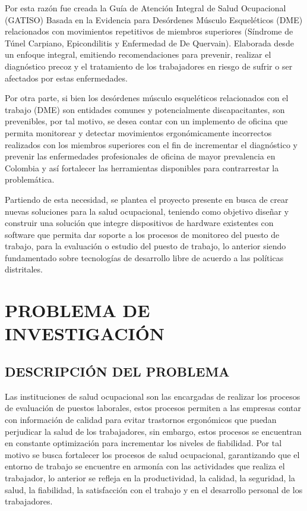 Por esta razón fue creada la Guía de Atención Integral de Salud Ocupacional (GATISO) Basada en la Evidencia para Desórdenes Músculo Esqueléticos (DME) relacionados con movimientos repetitivos de miembros superiores (Síndrome de Túnel Carpiano, Epicondilitis y Enfermedad de De Quervain). Elaborada desde un enfoque integral, emitiendo recomendaciones para prevenir, realizar el diagnóstico precoz y el tratamiento de los trabajadores en riesgo de sufrir o ser afectados por estas enfermedades.

Por otra parte, si bien los desórdenes músculo esqueléticos relacionados con el trabajo (DME) son entidades comunes y potencialmente discapacitantes, son prevenibles, por tal motivo, se desea contar con un implemento de oficina que permita monitorear y detectar movimientos ergonómicamente incorrectos realizados con los miembros superiores con el fin de incrementar el diagnóstico y prevenir las enfermedades profesionales de oficina de mayor prevalencia en Colombia y así fortalecer las herramientas disponibles para contrarrestar la problemática.

Partiendo de esta necesidad, se plantea el proyecto presente en busca de crear nuevas soluciones para la salud ocupacional, teniendo como objetivo diseñar y construir una solución que integre dispositivos de hardware existentes con software que permita dar soporte a los procesos de monitoreo del puesto de trabajo, para la evaluación o estudio del puesto de trabajo, lo anterior siendo fundamentado sobre tecnologías de desarrollo libre de acuerdo a las políticas distritales.

\chapter{PROBLEMA DE INVESTIGACIÓN}
\section{DESCRIPCIÓN DEL PROBLEMA}
Las instituciones de salud ocupacional son las encargadas de realizar los procesos de evaluación de puestos laborales, estos procesos permiten a las empresas contar con información de calidad para evitar trastornos ergonómicos que puedan perjudicar la salud de los trabajadores, sin embargo, estos procesos se encuentran en constante optimización para incrementar los niveles de fiabilidad. Por tal motivo se busca fortalecer los procesos de salud ocupacional, garantizando que el entorno de trabajo se encuentre en armonía con las actividades que realiza el trabajador, lo anterior se refleja en la productividad, la calidad, la seguridad, la salud, la fiabilidad, la satisfacción con el trabajo y en el desarrollo personal de los trabajadores.

